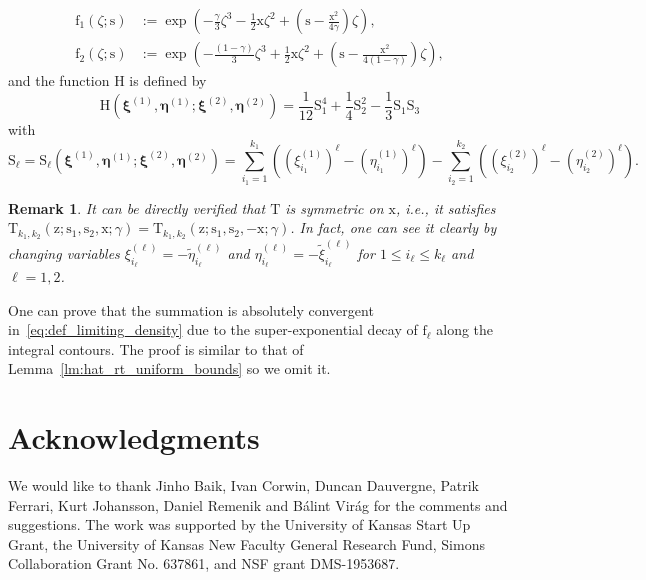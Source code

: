 \documentclass{article}
\newtheorem{rmk}[thm]{Remark}
\numberwithin{equation}{section}
\begin{document}
\begin{equation}
	\label{eq:def_rmf}
	\begin{split}
	\mathrm{f}_1(\zeta;\mathrm{s})&:=\exp\left(-\frac{\gamma}{3}\zeta^3-\frac12\mathrm{x}\zeta^2+\left(\mathrm{s}-\frac{\mathrm{x}^2}{4\gamma}\right)\zeta\right),\\
	 \mathrm{f}_2(\zeta;\mathrm{s})& := \exp\left(-\frac{(1-\gamma)}{3}\zeta^3+\frac12\mathrm{x}\zeta^2+\left(\mathrm{s}-\frac{\mathrm{x}^2}{4(1-\gamma)}\right)\zeta\right),
	 \end{split}
\end{equation}
and the function $\mathrm{H}$ is defined by
\begin{equation}
	\label{eq:def_rmH}
	\mathrm{H}(\boldsymbol{\xi}^{(1)},\boldsymbol{\eta}^{(1)};
	\boldsymbol{\xi}^{(2)},\boldsymbol{\eta}^{(2)})
	=\frac{1}{12}\mathrm{S}_1^4+\frac14\mathrm{S}_2^2-\frac13\mathrm{S}_1\mathrm{S}_3
\end{equation}
with
\begin{equation}
	\label{eq:def_S}
	\mathrm{S}_\ell
	=\mathrm{S}_\ell(\boldsymbol{\xi}^{(1)},\boldsymbol{\eta}^{(1)};
	\boldsymbol{\xi}^{(2)},\boldsymbol{\eta}^{(2)})
	=\sum_{i_1=1}^{k_1}
	      \left( \left(\xi_{i_1}^{(1)}\right)^{\ell}
	            -\left(\eta_{i_1}^{(1)}\right)^{\ell}
	      \right)
	 -\sum_{i_2=1}^{k_2}
	      \left( \left(\xi_{i_2}^{(2)}\right)^{\ell}
	             -\left(\eta_{i_2}^{(2)}\right)^{\ell}
	      \right).
\end{equation}

\begin{rmk}
	\label{rmk:symmetry_T}
	It can be directly verified that $\mathrm{T}$ is symmetric on $\mathrm{x}$, i.e., it satisfies $\mathrm{T}_{k_1,k_2}(\mathrm{z};\mathrm{s}_1,\mathrm{s}_2,\mathrm{x};\gamma)=\mathrm{T}_{k_1,k_2}(\mathrm{z};\mathrm{s}_1,\mathrm{s}_2,-\mathrm{x};\gamma)$. In fact, one can see it clearly by changing variables $\xi_{i_\ell}^{(\ell)}=-\tilde\eta_{i_\ell}^{(\ell)}$ and $\eta_{i_\ell}^{(\ell)}=-\tilde\xi_{i_\ell}^{(\ell)}$ for $1\le i_\ell\le k_\ell$ and $\ell=1,2$.
\end{rmk}

One can prove that the summation is absolutely convergent in~\eqref{eq:def_limiting_density} due to the super-exponential decay of $\mathrm{f}_\ell$ along the integral contours. The proof is similar to that of Lemma~\ref{lm:hat_rt_uniform_bounds} so we omit it.



\section*{Acknowledgments}
We would like to thank Jinho Baik, Ivan Corwin, Duncan Dauvergne, Patrik Ferrari, Kurt Johansson, Daniel Remenik and B\'alint Vir\'ag for the comments and suggestions. The work was supported by the University of Kansas Start Up Grant, the University of Kansas New Faculty General Research Fund, Simons Collaboration Grant No. 637861, and  NSF grant
DMS-1953687. 
\end{document}
